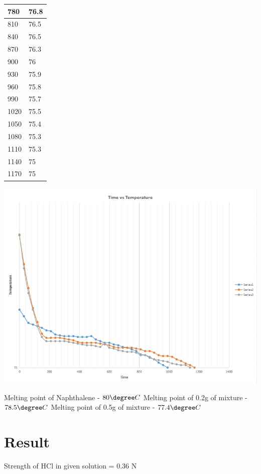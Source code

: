 \documentclass{report}
\begin{document}
{\begin{tabular}{|l|l|}
780           & 76.8                 \\ \hline
810           & 76.5                 \\ \hline
840           & 76.5                 \\ \hline
870           & 76.3                 \\ \hline
900           & 76                   \\ \hline
930           & 75.9                 \\ \hline
960           & 75.8                 \\ \hline
990           & 75.7                 \\ \hline
1020          & 75.5                 \\ \hline
1050          & 75.4                 \\ \hline
1080          & 75.3                 \\ \hline
1110          & 75.3                 \\ \hline
1140          & 75                   \\ \hline
1170          & 75                   \\ \hline
\end{tabular}
}
\begin{center}
    \includegraphics[scale= 0.5]{rast.jpg}
\end{center}
Melting point of Naphthalene - $80 \degree C$
Melting point of 0.2g of mixture - $78.5 \degree C$
Melting point of 0.5g of mixture - $77.4 \degree C$

\section*{Result}
Strength of HCl in given solution = 0.36 N
\end{document}
